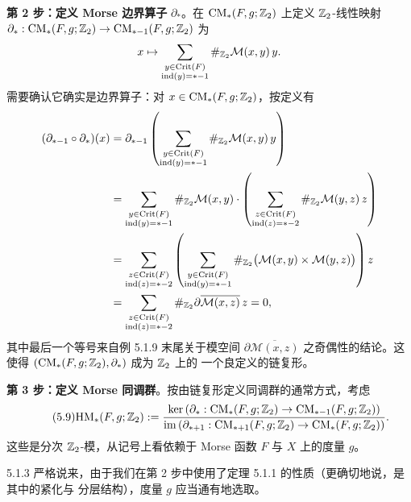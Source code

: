 \textbf{第 2 步：定义 Morse 边界算子} $\partial_*$。在
$\mathrm{CM}_*(F,g;\mathbb{Z}_2)$ 上定义 $\mathbb{Z}_2$-线性映射
$\partial_*:\mathrm{CM}_*(F,g;\mathbb{Z}_2)\to\mathrm{CM}_{*-1}(F,g;\mathbb{Z}_2)$ 为
\[
x\mapsto
\sum_{\substack{y\in\operatorname{Crit}(F)\\ \operatorname{ind}(y)=*-1}}
\#_{\mathbb{Z}_2}\mathcal M(x,y)\,y.
\]
需要确认它确实是边界算子：对 $x\in\mathrm{CM}_*(F,g;\mathbb{Z}_2)$，按定义有
\begin{align*}
(\partial_{*-1}\circ\partial_*)(x)
&=\partial_{*-1}\left(
\sum_{\substack{y\in\operatorname{Crit}(F)\\ \operatorname{ind}(y)=*-1}}
\#_{\mathbb{Z}_2}\mathcal M(x,y)\,y\right)\\
&=\sum_{\substack{y\in\operatorname{Crit}(F)\\ \operatorname{ind}(y)=*-1}}
\#_{\mathbb{Z}_2}\mathcal M(x,y)\cdot
\left(\sum_{\substack{z\in\operatorname{Crit}(F)\\ \operatorname{ind}(z)=*-2}}
\#_{\mathbb{Z}_2}\mathcal M(y,z)\,z\right)\\
&=\sum_{\substack{z\in\operatorname{Crit}(F)\\ \operatorname{ind}(z)=*-2}}
\left(\sum_{\substack{y\in\operatorname{Crit}(F)\\ \operatorname{ind}(y)=*-1}}
\#_{\mathbb{Z}_2}\big(\mathcal M(x,y)\times\mathcal M(y,z)\big)\right)z\\
&=\sum_{\substack{z\in\operatorname{Crit}(F)\\ \operatorname{ind}(z)=*-2}}
\#_{\mathbb{Z}_2}\partial\overline{\mathcal M(x,z)}\,z=0,
\end{align*}
其中最后一个等号来自例 5.1.9 末尾关于模空间 $\partial\overline{\mathcal M(x,z)}$
之奇偶性的结论。这使得 $(\mathrm{CM}_*(F,g;\mathbb{Z}_2),\partial_*)$ 成为 $\mathbb{Z}_2$ 上的
一个良定义的链复形。


\textbf{第 3 步：定义 Morse 同调群}。按由链复形定义同调群的通常方式，考虑
\begin{equation}\tag{5.9}
\mathrm{HM}_*(F,g;\mathbb{Z}_2):=
\frac{\ker\left(\partial_*:\mathrm{CM}_*(F,g;\mathbb{Z}_2)
\to\mathrm{CM}_{*-1}(F,g;\mathbb{Z}_2)\right)}
{\operatorname{im}\left(\partial_{*+1}:\mathrm{CM}_{*+1}(F,g;\mathbb{Z}_2)
\to\mathrm{CM}_*(F,g;\mathbb{Z}_2)\right)}.
\end{equation}
这些是分次 $\mathbb{Z}_2$-模，从记号上看依赖于 Morse 函数 $F$ 与 $X$ 上的度量 $g$。

\begin{wrem}{5.1.3}
严格说来，由于我们在第 2 步中使用了定理 5.1.1 的性质（更确切地说，是其中的紧化与
分层结构），度量 $g$ 应当通有地选取。
\end{wrem}

